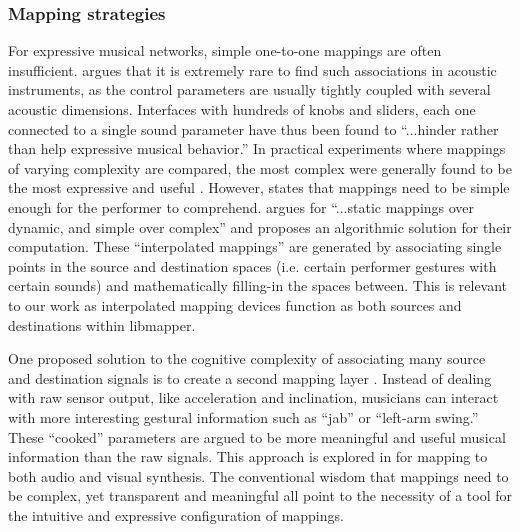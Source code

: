	\subsubsection{Mapping strategies}

For expressive musical networks, simple one-to-one mappings are often insufficient.  argues that it is extremely rare to find such associations in acoustic instruments, as the control parameters are usually tightly coupled with several acoustic dimensions. Interfaces with hundreds of knobs and sliders, each one connected to a single sound parameter have thus been found to ``...hinder rather than help expressive musical behavior.''  In practical experiments where mappings of varying complexity are compared, the most complex were generally found to be the most expressive and useful \cite{mapping_complexity_experiments}. However,  states that mappings need to be simple enough for the performer to comprehend.  argues for ``...static mappings over dynamic, and simple over complex'' and proposes an algorithmic solution for their computation. These ``interpolated mappings'' are generated by associating single points in the source and destination spaces (i.e. certain performer gestures with certain sounds) and mathematically filling-in the spaces between. This is relevant to our work as interpolated mapping devices function as both sources and destinations within libmapper.

One proposed solution to the cognitive complexity of associating many source and destination signals is to create a second mapping layer . Instead of dealing with raw sensor output, like acceleration and inclination, musicians can interact with more interesting gestural information such as ``jab'' or ``left-arm swing.'' These ``cooked'' parameters are argued to be more meaningful and useful musical information than the raw signals. This approach is explored in  for mapping to both audio and visual synthesis. The conventional wisdom that mappings need to be complex, yet transparent and meaningful all point to the necessity of a tool for the intuitive and expressive configuration of mappings.


